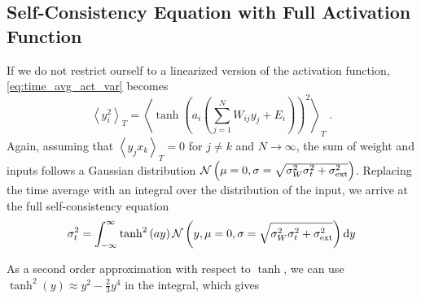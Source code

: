 \documentclass[10pt,a4paper]{article}
\newcommand{\avgt}[1]{\left< #1 \right>_T}
\begin{document}
\subsection{Self-Consistency Equation with Full Activation Function}
If we do not restrict ourself to a linearized version of the activation function, \eqref{eq:time_avg_act_var} becomes
\begin{equation}
	\avgt{y_i^2} = \avgt{\tanh\left(a_i\left(\sum_{j=1}^{N} W_{ij} y_j + E_i\right)\right)^2} \; .
\end{equation}
Again, assuming that $\avgt{y_j x_k}=0$ for $j\neq k$ and $N \rightarrow \infty$, the sum of weight and inputs follows a Gaussian distribution $\mathcal{N}\left(\mu = 0, \sigma = \sqrt{\sigma^2_{W}\sigma^2_{t} + \sigma^2_{\rm ext}}\right)$. Replacing the time average with an integral over the distribution of the input, we arrive at the full self-consistency equation
\begin{equation}
	\sigma^2_{t} = \int_{-\infty}^{\infty}  \tanh^2\left(ay\right) \mathcal{N}\left(y, \mu = 0, \sigma = \sqrt{\sigma^2_{W}\sigma^2_{t} + \sigma^2_{\rm ext}}\right)	\mathrm{d}y \label{eq:self-consistency_var_full}
\end{equation}

As a second order approximation with respect to $\tanh$, we can use $\tanh^2(y) \approx y^2 - \frac{2}{3} y^4$ in the integral, which gives
\end{document}
